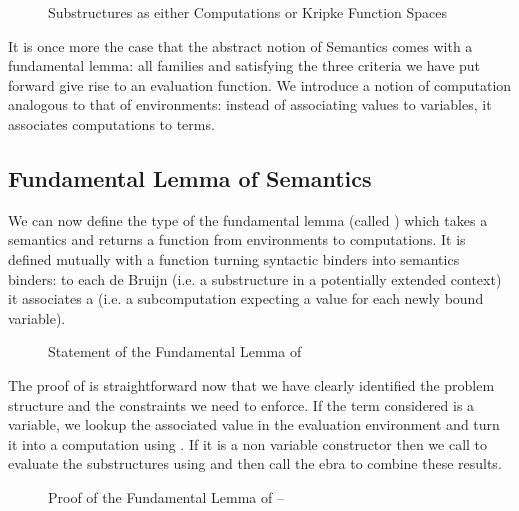 \begin{figure}[h]
\caption{Substructures as either Computations or Kripke Function Spaces}
\end{figure}

It is once more the case that the abstract notion of Semantics comes
with a fundamental lemma: all   families  and
 satisfying the three criteria we have put forward give rise
to an evaluation function. We introduce a notion of computation
 analogous to that of environments: instead of associating
values to variables, it associates computations to terms.

\begin{center}
\end{center}

\subsection{Fundamental Lemma of Semantics}

We can now define the type of the fundamental lemma (called \semfun{}) which
takes a semantics and returns a function from environments to computations.
It is defined mutually with a
function  turning syntactic binders into semantics binders: to
each de Bruijn  (i.e. a substructure in a potentially extended
context) it associates a  (i.e. a subcomputation expecting a
value for each newly bound variable).

\begin{figure}[h]
\caption{Statement of the Fundamental Lemma of \semrec{}}
\end{figure}

The proof of \semfun{} is straightforward now that we have clearly
identified the problem structure and the constraints we need to enforce.
If the term considered is a variable, we lookup the associated value in
the evaluation environment and turn it into a computation using .
If it is a non variable constructor then we call  to evaluate the
substructures using  and then call the ebra to combine
these results.

\begin{figure}[h]
\caption{Proof of the Fundamental Lemma of \semrec{} -- \semfun{}}
\end{figure}

